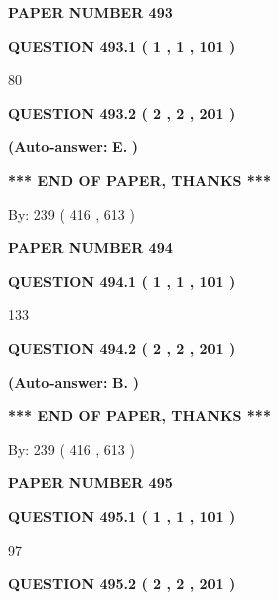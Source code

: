 \documentclass[12pt]{article}
\begin{document}
   
\newpage 
\setcounter{page}{ 
   493001 } 
   
   
 {\textbf{ \Large{ PAPER NUMBER  493  }}}
   
   
   
   
  
  
{\textbf{\large{QUESTION
493.1 
 ( 1 , 1 , 101 )
}}}

80
  
  
{\textbf{\large{QUESTION
493.2 
 ( 2 , 2 , 201 )
}}}
 
 
{\textbf{(Auto-answer:}}
{\textbf{\large{
E.}}}
{\textbf{)}}
 
 
   
   
   
   
\vspace{1.0in} 
{\textbf{\large{ *** END OF PAPER, THANKS *** }}} 
   
   
\hspace{1.0in} By: 
 239 ( 416 ,  613 )
   
   
   
   
\newpage 
\setcounter{page}{ 
   494001 } 
   
   
 {\textbf{ \Large{ PAPER NUMBER  494  }}}
   
   
   
   
  
  
{\textbf{\large{QUESTION
494.1 
 ( 1 , 1 , 101 )
}}}

133
  
  
{\textbf{\large{QUESTION
494.2 
 ( 2 , 2 , 201 )
}}}
 
 
{\textbf{(Auto-answer:}}
{\textbf{\large{
B.}}}
{\textbf{)}}
 
 
   
   
   
   
\vspace{1.0in} 
{\textbf{\large{ *** END OF PAPER, THANKS *** }}} 
   
   
\hspace{1.0in} By: 
 239 ( 416 ,  613 )
   
   
   
   
\newpage 
\setcounter{page}{ 
   495001 } 
   
   
 {\textbf{ \Large{ PAPER NUMBER  495  }}}
   
   
   
   
  
  
{\textbf{\large{QUESTION
495.1 
 ( 1 , 1 , 101 )
}}}

97
  
  
{\textbf{\large{QUESTION
495.2 
 ( 2 , 2 , 201 )
}}}
 
\end{document}
